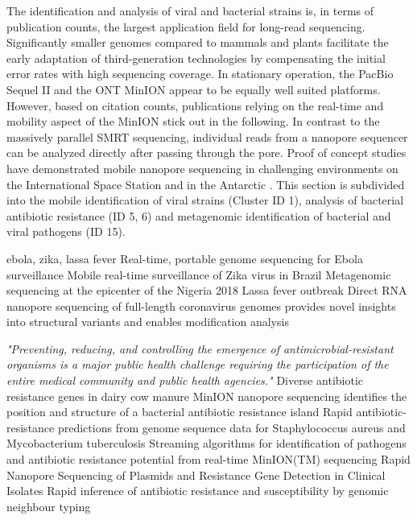 The identification and analysis of viral and bacterial strains is, in terms of publication counts, the largest application field for long-read sequencing.
Significantly smaller genomes compared to mammals and plants facilitate the early adaptation of third-generation technologies by compensating the initial error rates with high sequencing coverage.
In stationary operation, the PacBio Sequel II and the ONT MinION appear to be equally well suited platforms.
However, based on citation counts, publications relying on the real-time and mobility aspect of the MinION stick out in the following.
In contrast to the massively parallel SMRT sequencing, individual reads from a nanopore sequencer can be analyzed directly after passing through the pore.
Proof of concept studies have demonstrated mobile nanopore sequencing in challenging environments on the International Space Station \cite{Castro-Wallace2017} and in the Antarctic \cite{Johnson2017}.
This section is subdivided into the mobile identification of viral strains (Cluster ID 1), analysis of bacterial antibiotic resistance (ID 5, 6) and metagenomic identification of bacterial and viral pathogens (ID 15).


ebola, zika, lassa fever
Real-time, portable genome sequencing for Ebola surveillance \cite{Quick2016}
Mobile real-time surveillance of Zika virus in Brazil \cite{Faria2016}
Metagenomic sequencing at the epicenter of the Nigeria 2018 Lassa fever outbreak \cite{Kafetzopoulou2019}
Direct RNA nanopore sequencing of full-length coronavirus genomes provides novel insights into structural variants and enables modification analysis \cite{Viehweger2019}

\textit{"Preventing, reducing, and controlling the emergence of antimicrobial-resistant organisms is a major public health challenge requiring the participation of the entire medical community and public health agencies."} \cite{Septimus2011}
Diverse antibiotic resistance genes in dairy cow manure \cite{Wichmann2014}
MinION nanopore sequencing identifies the position and structure of a bacterial antibiotic resistance island \cite{Ashton2015}
Rapid antibiotic-resistance predictions from genome sequence data for Staphylococcus aureus and Mycobacterium tuberculosis \cite{Bradley2015}
Streaming algorithms for identification of pathogens and antibiotic resistance potential from real-time MinION(TM) sequencing \cite{Cao2016}
Rapid Nanopore Sequencing of Plasmids and Resistance Gene Detection in Clinical Isolates \cite{Lemon2017}
Rapid inference of antibiotic resistance and susceptibility by genomic neighbour typing \cite{Brinda2020}

